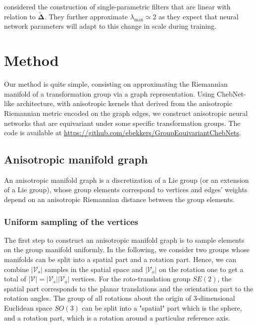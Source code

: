 \documentclass{article}
\begin{document}
\citet{kipf2016gcn} considered the construction of single-parametric filters that are linear with relation to $\boldsymbol{\tilde{\Delta}}$. They further approximate $\lambda_{\max} \simeq 2$ as they expect that neural network parameters will adapt to this change in scale during training.

\section{Method} \label{sec:method}

Our method is quite simple, consisting on approximating the Riemannian manifold of a transformation group via a graph representation. Using ChebNet-like architecture, with anisotropic kernels that derived from the anisotropic Riemannian metric encoded on the graph edges, we construct anisotropic neural networks that are equivariant under some specific transformation groups. The code is available at \url{https://github.com/ebekkers/GroupEquivariantChebNets}.

\subsection{Anisotropic manifold graph}

An anisotropic manifold graph is a discretization of a Lie group (or an extension of a Lie group), whose group elements correspond to vertices and edges' weights depend on an anisotropic Riemannian distance between the group elements. 

\subsubsection{Uniform sampling of the vertices}

The first step to construct an anisotropic manifold graph is to sample elements on the group manifold uniformly. In the following, we consider two groups whose manifolds can be split into a spatial part and a rotation part. Hence, we can combine $|\mathcal{V}_s|$ samples in the spatial space and $|\mathcal{V}_o|$ on the rotation one to get a total of $|\mathcal{V}| = |\mathcal{V}_s| |\mathcal{V}_o|$ vertices. For the roto-translation group  $SE(2)$, the spatial part corresponds to the planar translations and the orientation part to the rotation angles. The group of all rotations about the origin of 3-dimensional Euclidean space $SO(3)$ can be split into a "spatial" part which is the sphere, and a rotation part, which is a rotation around a particular reference axis.
\end{document}
